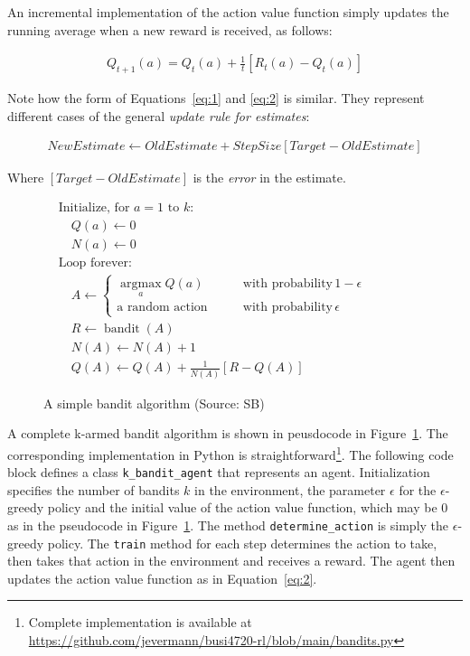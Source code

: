 An incremental implementation of the action value function simply updates the running average when a new reward is received, as follows:

\begin{align}
Q_{t+1}(a) = Q_t(a) + \frac{1}{t}\left[R_t(a) - Q_t(a)\right] \label{eq:2}
\end{align}

Note how the form of Equations~\ref{eq:1} and \ref{eq:2} is similar. They represent different cases of the general \emph{update rule for estimates}:

\begin{align*}
NewEstimate \leftarrow OldEstimate + StepSize \left[ Target - OldEstimate \right]
\end{align*}

Where $\left[ Target - OldEstimate \right]$ is the \emph{error} in the estimate.

\begin{figure}
\begin{pseudocodebox}
\begin{align*}
&\text{Initialize, for $a=1$ to $k$:}\\
&\quad Q(a) \leftarrow 0 \\
&\quad N(a) \leftarrow 0 \\
&\text{Loop forever:} \\
&\quad A \leftarrow \begin{cases} \operatorname*{arg max}_a Q(a) &\qquad \text{with probability}\, 1-\epsilon \\
\text{a random action} &\qquad \text{with probability} 
\, \epsilon
\end{cases} \hspace{1in} \\
&\quad R \leftarrow \operatorname{bandit}(A) \\
&\quad N(A) \leftarrow N(A) + 1 \\
&\quad Q(A) \leftarrow Q(A) + \frac{1}{N(A)} \left[ R - Q(A) \right]
\end{align*}
\end{pseudocodebox}
\caption{A simple bandit algorithm (Source: SB)}
\label{fig:karmedbandit}
\end{figure}

A complete k-armed bandit algorithm is shown in peusdocode in Figure~\ref{fig:karmedbandit}. The corresponding implementation in Python is straightforward\footnote{Complete implementation is available at \url{https://github.com/jevermann/busi4720-rl/blob/main/bandits.py}}. The following code block defines a class \texttt{k\_bandit\_agent} that represents an agent. Initialization specifies the number of bandits $k$ in the environment, the parameter $\epsilon$ for the $\epsilon$-greedy policy and the initial value of the action value function, which may be 0 as in the pseudocode in Figure~\ref{fig:karmedbandit}. The method \texttt{determine\_action} is simply the $\epsilon$-greedy policy. The \texttt{train} method for each step determines the action to take, then takes that action in the environment and receives a reward. The agent then updates the action value function as in Equation~\ref{eq:2}.

